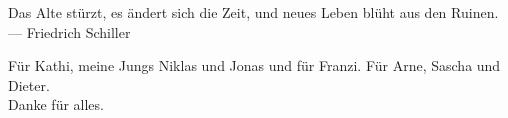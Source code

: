 
\thispagestyle{empty}


\vspace*{3cm}

\begin{center}
Das Alte stürzt, es ändert sich die Zeit, und neues Leben blüht aus den Ruinen. \\ \medskip
--- Friedrich Schiller
\end{center}

\medskip

\begin{center}
Für Kathi, meine Jungs Niklas und Jonas und für Franzi. Für Arne, Sascha und Dieter. \\ \smallskip
Danke für alles.
\end{center}
